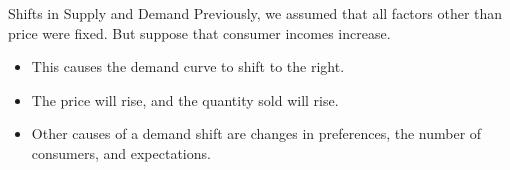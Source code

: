 \documentclass[12pt,t]{beamer}
\begin{document}
\begin{frame}{Shifts in Supply and Demand}
  Previously, we assumed that all factors other than price were fixed. But suppose that consumer incomes increase.

  \bigskip
  \begin{itemize}
    \item This causes the demand curve to shift to the right.

    \item The price will rise, and the quantity sold will rise.

    \item Other causes of a demand shift are changes in preferences, the number of consumers, and expectations.
  \end{itemize}
\end{frame}
\end{document}
